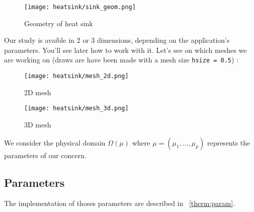 \begin{figure}[!h]
\centering
\texttt{[image: heatsink/sink\_geom.png]}
\caption{Geometry of heat sink}
\end{figure}

Our study is avaible in 2 or 3 dimensions, depending on the application's parameters. You'll see later how to work with it. Let's see on which meshes we are working on (draws are have been made with a mesh size \lstinline!hsize = 0.5!)  :
\begin{figure}[!h]
\begin{minipage}[b]{.50\linewidth}
\centering
\texttt{[image: heatsink/mesh\_2d.png]}
\caption{2D mesh}
\end{minipage}
\begin{minipage}[b]{.50\linewidth}
\centering
\texttt{[image: heatsink/mesh\_3d.png]}
\caption{3D mesh}
\end{minipage}
\end{figure}

We consider the physical domain $\varOmega (\mu)$ where $\mu = (\mu_1, ...,\mu_p)$ represents the parameters of our concern. 

\subsection{Parameters}
The implementation of thoses parameters are described in ~\ref{therm:param}.

